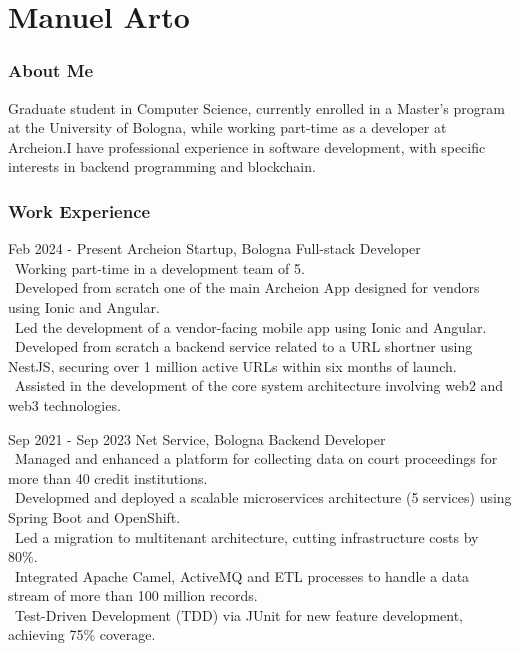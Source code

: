 \documentclass{tccv}
\begin{document}
\part{Manuel Arto}

\section{About Me}

Graduate student in Computer Science, currently enrolled in a Master's program at the University of Bologna, while working part-time as a developer at Archeion.\newline I have professional experience in software development, with specific interests in backend programming and blockchain.

\section{Work Experience}

\begin{eventlist}

     \item{Feb 2024 - Present}
     {Archeion Startup, Bologna}
     {Full-stack Developer} \\
     \textbullet~Working part-time in a development team of 5. \\
     \textbullet~Developed from scratch one of the main Archeion App designed for vendors using Ionic and Angular. \\
     \textbullet~Led the development of a vendor-facing mobile app using Ionic and Angular. \\
     \textbullet~Developed from scratch a backend service related to a URL shortner using NestJS, securing over 1 million active URLs within six months of launch. \\
     \textbullet~Assisted in the development of the core system architecture involving web2 and web3 technologies.

     \item{Sep 2021 - Sep 2023}
     {Net Service, Bologna}
     {Backend Developer} \\
     \textbullet~Managed and enhanced a platform for collecting data on court proceedings for more than 40 credit institutions. \\
     \textbullet~Developmed and deployed a scalable microservices architecture (5 services) using Spring Boot and OpenShift. \\
     \textbullet~Led a migration to multitenant architecture, cutting infrastructure costs by 80\%. \\
     \textbullet~Integrated Apache Camel, ActiveMQ and ETL processes to handle a data stream of more than 100 million records. \\
     \textbullet~Test-Driven Development (TDD) via JUnit for new feature development, achieving 75\% coverage.

\end{eventlist}
\end{document}
